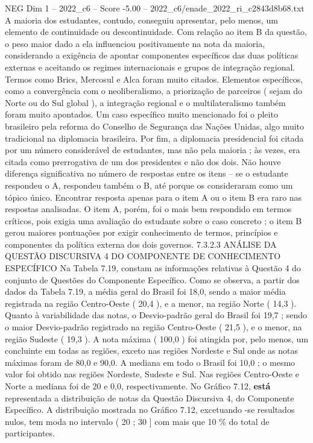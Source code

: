 \begin{textsample}{NEG Dim 1 – 2022\_c6 – Score -5.00 – 2022\_c6/enade\_2022\_ri\_c2843d8b68.txt}
A maioria dos estudantes, contudo, conseguiu apresentar, pelo menos, um elemento de continuidade ou descontinuidade.
Com relação ao item B da questão, o peso maior dado a ela influenciou positivamente na nota da maioria, considerando a exigência de apontar componentes específicos das duas políticas externas e aceitando os regimes internacionais e grupos de integração regional.
Termos como Brics, Mercosul e Alca foram muito citados.
Elementos específicos, como a convergência com o neoliberalismo, a priorização de parceiros ( sejam do Norte ou do Sul global ), a integração regional e o multilateralismo também foram muito apontados.
Um caso específico muito mencionado foi o pleito brasileiro pela reforma do Conselho de Segurança das Nações Unidas, algo muito tradicional na diplomacia brasileira.
Por fim, a diplomacia presidencial foi citada por um número considerável de estudantes, mas não pela maioria ; às vezes, era citada como prerrogativa de um dos presidentes e não dos dois.
Não houve diferença significativa no número de respostas entre os itens – se o estudante respondeu o A, respondeu também o B, até porque os consideraram como um tópico único.
Encontrar resposta apenas para o item A ou o item B era raro nas respostas analisadas.
O item A, porém, foi o mais bem respondido em termos críticos, pois exigia uma avaliação do estudante sobre o caso concreto ; o item B gerou maiores pontuações por exigir conhecimento de termos, princípios e componentes da política externa dos dois governos. 7.3.2.3 ANÁLISE DA QUESTÃO DISCURSIVA 4 DO COMPONENTE DE CONHECIMENTO ESPECÍFICO Na Tabela 7.19, constam as informações relativas à Questão 4 do conjunto de Questões do Componente Específico.
Como se observa, a partir dos dados da Tabela 7.19, a média geral do Brasil foi 18,0, sendo a maior média registrada na região Centro-Oeste ( 20,4 ), e a menor, na região Norte ( 14,3 ).
Quanto à variabilidade das notas, o Desvio-padrão geral do Brasil foi 19,7 ; sendo o maior Desvio-padrão registrado na região Centro-Oeste ( 21,5 ), e o menor, na região Sudeste ( 19,3 ).
A nota máxima ( 100,0 ) foi atingida por, pelo menos, um concluinte em todas as regiões, exceto nas regiões Nordeste e Sul onde as notas máximas foram de 80,0 e 90,0.
A mediana em todo o Brasil foi 10,0 ; o mesmo valor foi obtido nas regiões Nordeste, Sudeste e Sul.
Nas regiões Centro-Oeste e Norte a mediana foi de 20 e 0,0, respectivamente.
No Gráfico 7.12, \textbf{está} representada a distribuição de notas da Questão Discursiva 4, do Componente Específico.
A distribuição mostrada no Gráfico 7.12, excetuando -se resultados nulos, tem moda no intervalo ( 20 ; 30 ] com mais que 10 \% do total de participantes.

\end{textsample}
